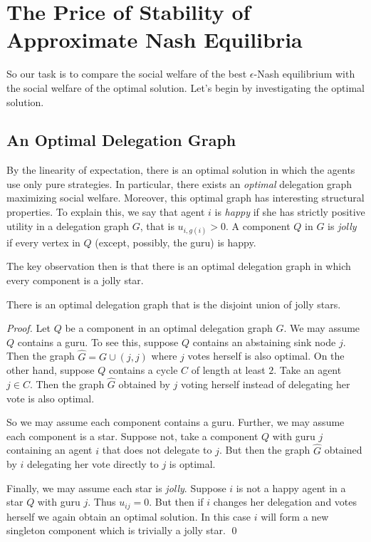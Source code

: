\section{The Price of Stability of Approximate Nash Equilibria}\label{sec:bicriteria}

So our task is to compare the social welfare of the best $\epsilon$-Nash equilibrium with
the social welfare of the optimal solution. Let's begin by investigating the optimal solution.

\subsection{An Optimal Delegation Graph} 
By the linearity of expectation, there is an optimal solution in which the agents use only pure strategies. 
In particular, there exists an {\em optimal} delegation graph maximizing social welfare. Moreover, this optimal graph 
has interesting structural properties. 
To explain this, we say that agent $i$ is {\em happy} if she has strictly positive utility in a delegation graph $G$, that is 
$u_{i,g(i)}>0$.  A component $Q$ in $G$ is {\em jolly} if every vertex in $Q$ (except, possibly, the guru) is happy.

The key observation then is that there is an optimal delegation graph in which every component is a jolly star. 

 
\begin{lem}\label{lem: OptLD}
There is an optimal delegation graph that is the disjoint union of jolly stars.
\end{lem}
\begin{proof}
Let $Q$ be a component in an optimal delegation graph $G$. We may assume $Q$ contains a guru.
To see this, suppose $Q$ contains an abstaining sink node $j$. Then the graph $\hat{G}=G\cup (j,j)$ where $j$ votes 
herself is also optimal. On the other hand, suppose $Q$ contains a cycle $C$ of length at least $2$. Take an agent $j\in C$. 
Then the graph $\hat{G}$ obtained by $j$ voting herself instead of delegating her vote is also optimal.

So we may assume each component contains a guru. Further, we may assume each component is a star.
Suppose not, take a component $Q$ with guru $j$ containing an agent $i$ that does not delegate to $j$.
But then the graph $\hat{G}$ obtained by $i$ delegating her vote directly to $j$ is optimal.

Finally, we may assume each star is {\em jolly}. Suppose $i$ is not a happy agent in a star $Q$ with guru $j$.
Thus $u_{ij}=0$. But then if $i$ changes her delegation and votes herself we again obtain an optimal solution.
In this case $i$ will form a new singleton component which is trivially a jolly star. \qed
\end{proof}

